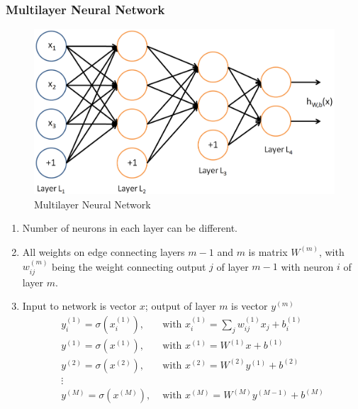 \documentclass[11pt,a4paper]{article}
\begin{document}
\subsubsection{Multilayer Neural Network}
\begin{center}\begin{figure}[htbp]
    \centering
    \includegraphics[scale=0.2]{MNN.png}
    \caption{Multilayer Neural Network}
    \label{}
\end{figure}\end{center}
\begin{enumerate}[$\bullet$]
    \item Number of neurons in each layer can be different.
    \item All weights on edge connecting layers $m-1$ and $m$ is matrix $W^{(m)}$, with $w_{ij}^{(m)}$ being the weight connecting output $j$ of layer $m-1$ with neuron $i$ of layer $m$.
    \item Input to network is vector $x$; output of layer $m$ is vector $y^{(m)}$
    \begin{equation}
        \begin{aligned}
            y_i^{(1)}=\sigma(x_i^{(1)}),&\text{ with }x_i^{(1)}=\sum_jw_{ij}^{(1)}x_j+b_i^{(1)}\\
            y^{(1)}=\sigma(x^{(1)}),&\text{ with }x^{(1)}=W^{(1)}x+b^{(1)}\\
            y^{(2)}=\sigma(x^{(2)}),&\text{ with }x^{(2)}=W^{(2)}y^{(1)}+b^{(2)}\\
            \vdots&\\
            y^{(M)}=\sigma(x^{(M)}),&\text{ with }x^{(M)}=W^{(M)}y^{(M-1)}+b^{(M)}\\
        \end{aligned}
        \nonumber
    \end{equation}
\end{enumerate}
\end{document}
